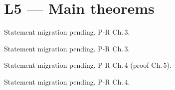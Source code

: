 \chapter{L5 — Main theorems}


\begin{theorem}
  \label{thm:l5_firstMain}
  \notready
  Statement migration pending. P-R Ch.\,3.
\end{theorem}

\begin{theorem}
  \label{thm:l5_plancherel}
  \notready
  Statement migration pending. P-R Ch.\,3.
\end{theorem}

\begin{theorem}
  \label{thm:l5_secondMain}
  \notready
  Statement migration pending. P-R Ch.\,4 (proof Ch.\,5).
\end{theorem}

\begin{theorem}
  \label{thm:l5_eigenvector}
  \notready
  Statement migration pending. P-R Ch.\,4.
\end{theorem}
